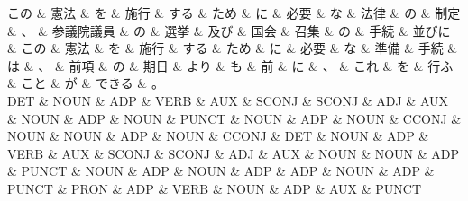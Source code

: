 \documentclass[tikz,border=5pt]{standalone}
\begin{document}
\small
\begin{dependency}[edge unit distance=12.0pt]
    \begin{deptext}[column sep=0.5em]
        この \& 憲法 \& を \& 施行 \& する \& ため \& に \& 必要 \& な \& 法律 \& の \& 制定 \& 、 \& 参議院議員 \& の \& 選挙 \& 及び \& 国会 \& 召集 \& の \& 手続 \& 並びに \& この \& 憲法 \& を \& 施行 \& する \& ため \& に \& 必要 \& な \& 準備 \& 手続 \& は \& 、 \& 前項 \& の \& 期日 \& より \& も \& 前 \& に \& 、 \& これ \& を \& 行ふ \& こと \& が \& できる \& 。\\
        DET \& NOUN \& ADP \& VERB \& AUX \& SCONJ \& SCONJ \& ADJ \& AUX \& NOUN \& ADP \& NOUN \& PUNCT \& NOUN \& ADP \& NOUN \& CCONJ \& NOUN \& NOUN \& ADP \& NOUN \& CCONJ \& DET \& NOUN \& ADP \& VERB \& AUX \& SCONJ \& SCONJ \& ADJ \& AUX \& NOUN \& NOUN \& ADP \& PUNCT \& NOUN \& ADP \& NOUN \& ADP \& ADP \& NOUN \& ADP \& PUNCT \& PRON \& ADP \& VERB \& NOUN \& ADP \& AUX \& PUNCT\\
    \end{deptext}
\end{dependency}
\end{document}
